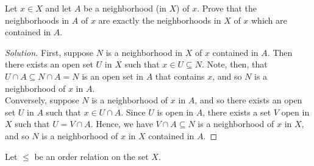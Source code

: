 \documentclass[12pt]{article}
\newenvironment{problem}[2][Problem]{\begin{trivlist}
\item[\hskip \labelsep {\bfseries #1}\hskip \labelsep {\bfseries #2.}]}{\end{trivlist}}
\newenvironment{solution}
  {\renewcommand\qedsymbol{$\blacksquare$}\begin{proof}[Solution]}
{\end{proof}}
\begin{document}
\begin{problem}{6}
  Let $x\in X$ and let $A$ be a neighborhood (in $X$) of $x$.
  Prove that the neighborhoods in $A$ of $x$ are exactly the
  neighborhoods in $X$ of $x$ which are contained in $A$.
\end{problem}
\begin{solution}
  First, suppose $N$ is a neighborhood in $X$ of $x$ contained in $A$. 
  Then there exists an open set $U$ in $X$ such that $x\in U\subseteq N$.
  Note, then, that $U\cap A\subseteq N\cap A = N$ is an open set in $A$
  that contains $x$, and so $N$ is a neighborhood of $x$ in $A$.\\
  \indent Conversely, suppose $N$ is a neighborhood of $x$ in $A$, and so
  there exists an open set $U$ in $A$ such that $x\in U\cap A$.
  Since $U$ is open in $A$, there exists a set $V$ open in $X$ such
  that $U=V\cap A$.
  Hence, we have $V\cap A\subseteq N$ is a neighborhood of $x$ in $X$,
  and so $N$ is a neighborhood of $x$ in $X$ contained in $A$.
\end{solution}
\begin{problem}{7}
  Let $\leq$ be an order relation on the set $X$.
\end{problem}
\end{document}
